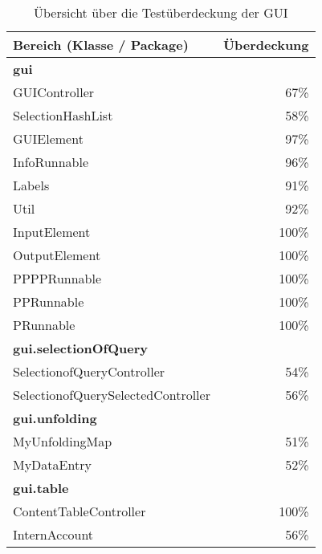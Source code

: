 \begin{table}[h]
\centering
\begin{tabular} {l||r}
	\label{tbl:coverageGui}
	Bereich (Klasse / Package) & Überdeckung \\
	\hline
	\hline
		\textbf{gui} \\
		\hspace*{3mm}GUIController & 67\% \\
		\hspace*{3mm}SelectionHashList & 58\% \\
		\hspace*{3mm}GUIElement & 97\% \\
		\hspace*{3mm}InfoRunnable & 96\% \\
		\hspace*{3mm}Labels & 91\% \\
		\hspace*{3mm}Util & 92\% \\
		\hspace*{3mm}InputElement & 100\% \\
		\hspace*{3mm}OutputElement & 100\% \\
		\hspace*{3mm}PPPPRunnable & 100\% \\
		\hspace*{3mm}PPRunnable & 100\% \\
		\hspace*{3mm}PRunnable & 100\% \\
		\hline
		\textbf{gui.selectionOfQuery} \\
		\hspace*{3mm}SelectionofQueryController & 54\% \\
		\hspace*{3mm}SelectionofQuerySelectedController & 56\% \\
		\hline
		\textbf{gui.unfolding} \\
		\hspace*{3mm}MyUnfoldingMap & 51\% \\
		\hspace*{3mm}MyDataEntry & 52\% \\
		\hline
		\textbf{gui.table} \\
		\hspace*{3mm}ContentTableController & 100\% \\
		\hspace*{3mm}InternAccount & 56\% \\
	\end{tabular}
	\caption{Übersicht über die Testüberdeckung der GUI}
\end{table}

